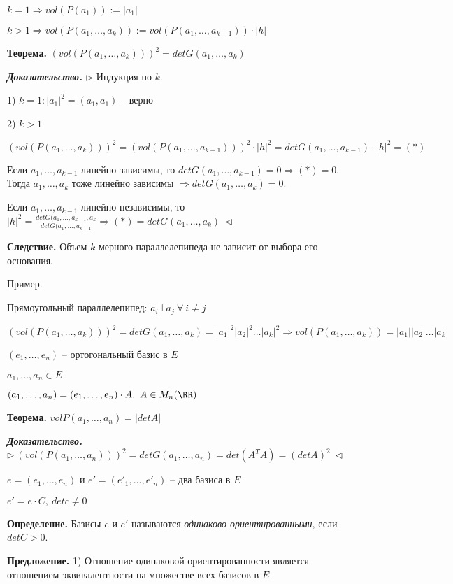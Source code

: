 \bigskip
$k = 1 \Rightarrow vol(P(a_1)) := |a_1|$

$k > 1 \Rightarrow vol(P(a_1, \dots, a_k)) := vol(P(a_1, \dots, a_{k-1})) \cdot |h|$

\bigskip
\textbf{Теорема.} $(vol(P(a_1, \dots, a_k)))^2 = det G(a_1, \dots, a_k)$

\bigskip
\textbf{\textit{Доказательство.}} $\rhd$ Индукция по $k$. 

1) $k = 1: |a_1|^2 = (a_1, a_1)$ -- верно

2) $k > 1$

$(vol(P(a_1, \dots, a_k)))^2 = (vol(P(a_1, \dots, a_{k-1})))^2 \cdot |h|^2 = det G(a_1, \dots, a_{k-1}) \cdot |h|^2 = (*)$

Если $a_1, \dots, a_{k-1}$ линейно зависимы, то $det G(a_1, \dots, a_{k-1}) = 0 \Rightarrow (*) = 0$. Тогда $a_1, \dots, a_k$ тоже линейно зависимы $\Rightarrow det G(a_1, \dots, a_k) = 0$.

Если $a_1, \dots, a_{k-1}$ линейно независимы, то $|h|^2 = \frac{det G(a_1, \dots, a_{k-1}, a_k}{det G(a_1, \dots, a_{k-1}} \Rightarrow (*) = det G(a_1, \dots, a_k) \ \lhd$

\bigskip
\textbf{Следствие.} Объем $k$-мерного параллелепипеда не зависит от выбора его основания.

\bigskip
Пример.

Прямоугольный параллелепипед: $a_i \bot a_j \ \forall \ i \neq j$

$(vol(P(a_1, \dots, a_k)))^2 = det G(a_1, \dots, a_k) = |a_1|^2 |a_2|^2 \dots |a_k|^2 \Rightarrow vol(P(a_1, \dots, a_k)) = |a_1||a_2| \dots |a_k|$

\bigskip
$(e_1, \dots, e_n)$ -- ортогональный базис в $E$

$a_1, \dots, a_n \in E$

$(a_1, \dots, a_n) = (e_1, \dots, e_n) \cdot A, \ A \in M_n (\RR)$

\bigskip
\textbf{Теорема.} $vol P(a_1, \dots, a_n) = |det A|$

\bigskip
\textbf{\textit{Доказательство.}} $\rhd \ (vol(P(a_1, \dots, a_n)))^2 = det G(a_1, \dots, a_n) = det (A^T A) = (det A)^2 \ \lhd$

\bigskip
$e = (e_1, \dots, e_n)$ и $e' = (e'_1, \dots, e'_n)$ -- два базиса в $E$

$e' = e \cdot C, \ detc \neq 0$

\bigskip
\textbf{Определение.} Базисы $e$ и $e'$ называются \textit{одинаково ориентированными}, если $detC > 0$.

\bigskip
\textbf{Предложение.} 1) Отношение одинаковой ориентированности является отношением эквивалентности на множестве всех базисов в $E$

